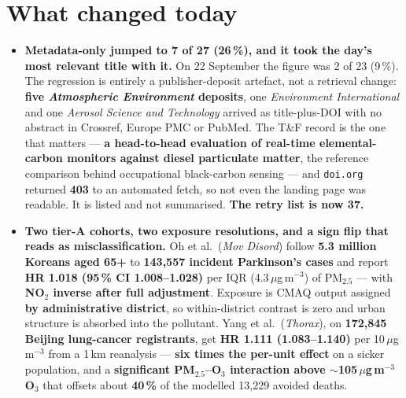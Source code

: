 \documentclass[10pt]{article}
\begin{document}
\vspace{3mm}

\section*{\sffamily\bfseries\color{Deep}What changed today}
\vspace{-1.5mm}{\color{Amber}\rule{\linewidth}{1.1pt}}\vspace{2.5mm}

\footnotesize
\begin{itemize}

\item \textbf{Metadata-only jumped to 7 of 27 (26\,\%), and it took the day's most relevant
title with it.} On 22 September the figure was 2 of 23 (9\,\%). The regression is entirely
a publisher-deposit artefact, not a retrieval change: \textbf{five \textit{Atmospheric
Environment} deposits}, one \textit{Environment International} and one \textit{Aerosol
Science and Technology} arrived as title-plus-DOI with no abstract in Crossref, Europe PMC
or PubMed. The T\&F record is the one that matters --- \textbf{a head-to-head evaluation of
real-time elemental-carbon monitors against diesel particulate matter}, the reference
comparison behind occupational black-carbon sensing --- and \texttt{doi.org} returned
\textbf{403} to an automated fetch, so not even the landing page was readable. It is listed
and not summarised. \textbf{The retry list is now 37.}

\item \textbf{Two tier-A cohorts, two exposure resolutions, and a sign flip that reads as
misclassification.} Oh et al.\ (\textit{Mov Disord}) follow \textbf{5.3 million Koreans aged
65+} to \textbf{143,557 incident Parkinson's cases} and report \textbf{HR 1.018 (95\,\% CI
1.008--1.028)} per IQR (4.3\,$\mu$g\,m$^{-3}$) of PM$_{2.5}$ --- with \textbf{NO$_2$
inverse after full adjustment}. Exposure is CMAQ output assigned \textbf{by administrative
district}, so within-district contrast is zero and urban structure is absorbed into the
pollutant. Yang et al.\ (\textit{Thorax}), on \textbf{172,845 Beijing lung-cancer
registrants}, get \textbf{HR 1.111 (1.083--1.140)} per 10\,$\mu$g\,m$^{-3}$ from a 1\,km
reanalysis --- \textbf{six times the per-unit effect} on a sicker population, and a
\textbf{significant PM$_{2.5}$--O$_3$ interaction above $\sim$105\,$\mu$g\,m$^{-3}$ O$_3$}
that offsets about \textbf{40\,\%} of the modelled 13,229 avoided deaths.


\end{itemize}
\end{document}
